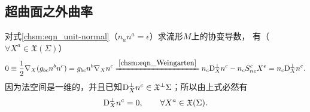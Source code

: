 


\subsection{超曲面之外曲率}\label{chsm:sec_hypersurface-basic-equations}
对式\eqref{chsm:eqn_unit-normal}（$n_a n^a = \epsilon$）求流形$M$上的协变导数，
有（$\forall X^a\in \mathfrak{X}(\Sigma)$）
\begin{equation*}
    0\equiv \frac{1}{2}\nabla_X (g_{bc} {n}^b {n}^c)=g_{bc} {n}^b \nabla_X  {n}^c
    \xlongequal{\ref{chsm:eqn_Weingarten}}
    {n}_c {\rm D}^\bot_X  {n}^c - {n}_c  S_{ne}^c X^e
    ={n}_c {\rm D}^\bot_X  {n}^c .
\end{equation*}
因为法空间是一维的，并且已知${\rm D}^\bot_X  {n}^c \in  \mathfrak{X}^\bot{\Sigma}$；所以由上式必然有
\begin{equation}\label{chsm:eqn_DbotN=0}
    {\rm D}^\bot_X  {n}^c =0, \qquad \forall X^a\in \mathfrak{X}(\Sigma).
\end{equation}




